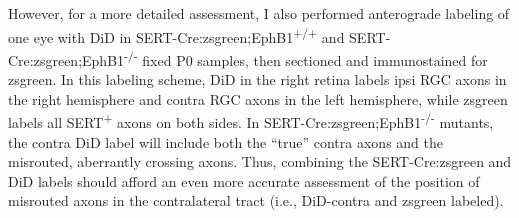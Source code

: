 However, for a more detailed assessment, I also performed anterograde labeling of one eye with DiD in SERT-Cre:zsgreen;EphB1\textsuperscript{+/+} and SERT-Cre:zsgreen;EphB1\textsuperscript{-/-} fixed P0 samples, then sectioned and immunostained for zsgreen.
In this labeling scheme, DiD in the right retina labels ipsi RGC axons in the right hemisphere and contra RGC axons in the left hemisphere, while zsgreen labels all SERT\textsuperscript{+} axons on both sides.
In SERT-Cre:zsgreen;EphB1\textsuperscript{-/-} mutants, the contra DiD label will include both the ``true'' contra axons and the misrouted, aberrantly crossing axons.
Thus, combining the SERT-Cre:zsgreen and DiD labels should afford an even more accurate assessment of the position of misrouted axons in the contralateral tract (i.e., DiD-contra and zsgreen labeled).

